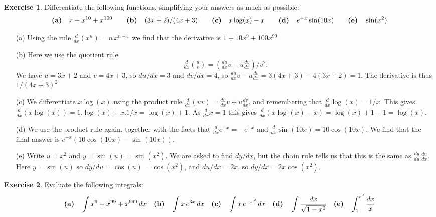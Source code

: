 \documentclass[a4paper]{amsart}
\theoremstyle{definition}
\newtheorem{exercise}{Exercise}[section]
\newenvironment{solution}{{\noindent \bf Solution:}}{}
\begin{document}
\begin{exercise}\label{ex-diff-misc-i}
Differentiate the following functions, simplifying your
 answers as much as possible:
 \[
  \text{\textbf{(a)}}\quad x+x^{10}+x^{100} \hspace{2em}
  \text{\textbf{(b)}}\quad (3x+2)/(4x+3) \hspace{2em} 
  \text{\textbf{(c)}}\quad x\log(x)-x \hspace{2em}
  \text{\textbf{(d)}}\quad e^{-x}\sin(10 x) \hspace{2em}
  \text{\textbf{(e)}}\quad \sin(x^2)
 \]
\end{exercise}
\begin{solution}
\begin{itemize}
  \item[(a)] Using the rule $\tfrac{d}{dx}(x^n)=n\,x^{n-1}$ we find
    that the derivative is $1+10x^9+100x^{99}$
  \item[(b)] Here we use the quotient rule 
   \[ \tfrac{d}{dx}\left(\tfrac{u}{v}\right) =
       \left(\tfrac{du}{dx}v - u\tfrac{dv}{dx}\right)/v^2.
   \]
   We have $u=3x+2$ and $v=4x+3$, so $du/dx=3$ and $dv/dx=4$, so
   $\tfrac{du}{dx}v-u\tfrac{dv}{dx}=3(4x+3)-4(3x+2)=1$.  The
   derivative is thus $1/(4x+3)^2$
  \item[(c)] We differentiate $x\log(x)$ using the product rule
    $\tfrac{d}{dx}(uv)=\tfrac{du}{dx}v+u\tfrac{dv}{dx}$, and
    remembering that $\tfrac{d}{dx}\log(x)=1/x$.  This gives
    $\tfrac{d}{dx}(x\log(x))=1.\log(x)+x.1/x=\log(x)+1$.  As
    $\tfrac{d}{dx}x=1$ this gives
    $\tfrac{d}{dx}(x\log(x)-x)=\log(x)+1-1=\log(x)$. 
  \item[(d)] We use the product rule again, together with the facts
    that $\frac{d}{dx}e^{-x}=-e^{-x}$ and
    $\frac{d}{dx}\sin(10x)=10\cos(10x)$.  We find that the final
    answer is $e^{-x}(10\cos(10 x)-\sin(10 x))$.
  \item[(e)] Write $u=x^2$ and $y=\sin(u)=\sin(x^2)$.  We are asked to
    find $dy/dx$, but the chain rule tells us that this is the same as
    $\frac{dy}{du}\,\frac{du}{dx}$.  Here $y=\sin(u)$ so
    $dy/du=\cos(u)=\cos(x^2)$, and $du/dx=2x$, so $dy/dx=2x\cos(x^2)$.
 \end{itemize}
\end{solution}
\begin{exercise}\label{ex-int-misc-i}
Evaluate the following integrals:
\[ 
  \text{\textbf{(a)}}\quad \int x^9+x^{99}+x^{999}\,dx \hspace{1em}
  \text{\textbf{(b)}}\quad \displaystyle\int x\,e^{3x}\,dx \hspace{1em}
  \text{\textbf{(c)}}\quad \displaystyle\int x\,e^{-x^2}\,dx \hspace{1em}
  \text{\textbf{(d)}}\quad \displaystyle\int\frac{dx}{\sqrt{1-x^2}} \hspace{1em}
  \text{\textbf{(e)}}\quad \displaystyle\int_1^{e^2}\frac{dx}{x}
\]
\end{exercise}
\end{document}
